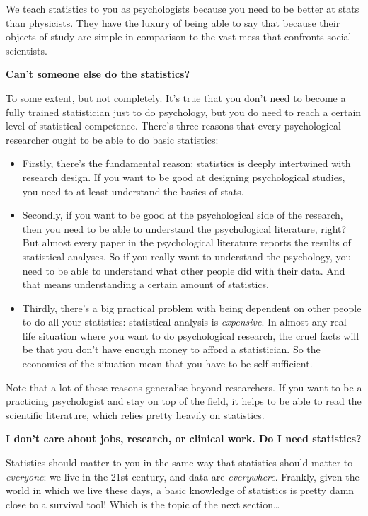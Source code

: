 \documentclass[
  11pt,
]{book}
\providecommand{\tightlist}{%
  \setlength{\itemsep}{0pt}\setlength{\parskip}{0pt}}
\theoremstyle{indenteddefinition}
\theoremstyle{indenteddefinition}
\theoremstyle{definition}
\theoremstyle{definition}
\theoremstyle{remark}
\begin{document}
We teach statistics to you as psychologists because you need to be better at stats than physicists. They have the luxury of being able to say that because their objects of study are simple in comparison to the vast mess that confronts social scientists.

\textbf{Can't someone else do the statistics?}

To some extent, but not completely. It's true that you don't need to become a fully trained statistician just to do psychology, but you do need to reach a certain level of statistical competence. There's three reasons that every psychological researcher ought to be able to do basic statistics:

\begin{itemize}
\tightlist
\item
  Firstly, there's the fundamental reason: statistics is deeply intertwined with research design. If you want to be good at designing psychological studies, you need to at least understand the basics of stats.
\item
  Secondly, if you want to be good at the psychological side of the research, then you need to be able to understand the psychological literature, right? But almost every paper in the psychological literature reports the results of statistical analyses. So if you really want to understand the psychology, you need to be able to understand what other people did with their data. And that means understanding a certain amount of statistics.
\item
  Thirdly, there's a big practical problem with being dependent on other people to do all your statistics: statistical analysis is \emph{expensive}. In almost any real life situation where you want to do psychological research, the cruel facts will be that you don't have enough money to afford a statistician. So the economics of the situation mean that you have to be self-sufficient.
\end{itemize}

Note that a lot of these reasons generalise beyond researchers. If you want to be a practicing psychologist and stay on top of the field, it helps to be able to read the scientific literature, which relies pretty heavily on statistics.

\textbf{I don't care about jobs, research, or clinical work. Do I need statistics?}

Statistics should matter to you in the same way that statistics should matter to \emph{everyone}: we live in the 21st century, and data are \emph{everywhere}. Frankly, given the world in which we live these days, a basic knowledge of statistics is pretty damn close to a survival tool! Which is the topic of the next section\ldots{}
\end{document}

